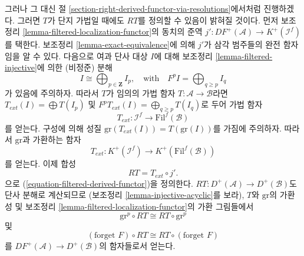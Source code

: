 \medskip\noindent
그러나 그 대신 절
\ref{section-right-derived-functor-via-resolutions}에서처럼 진행하겠다.
그러면 $T$가 단지 가법일 때에도 $RT$를 정의할 수 있음이 밝혀질
것이다. 먼저 보조정리 \ref{lemma-filtered-localization-functor}의 동치의
준역 $j' : DF^{+}(\mathcal{A}) \to K^{+}(\mathcal{I}^f)$를 택한다.
보조정리 \ref{lemma-exact-equivalence}에 의해 $j'$가 삼각 범주들의
완전 함자임을 알 수 있다. 다음으로 여과 단사 대상 $I$에 대해 보조정리
\ref{lemma-filtered-injective}에 의한 (비정준) 분해
\begin{equation}
\label{equation-decompose}
I \cong \bigoplus\nolimits_{p \in \mathbf{Z}} I_p,
\quad\text{with}\quad
F^pI = \bigoplus\nolimits_{q \geq p} I_q
\end{equation}
가 있음에 주의하자. 따라서 $T$가 임의의 가법 함자
$T : \mathcal{A} \to \mathcal{B}$라면
$T_{ext}(I) = \bigoplus T(I_p)$ 및
$F^pT_{ext}(I) = \bigoplus_{q \geq p} T(I_q)$로 두어 가법 함자
\begin{equation}
\label{equation-extend-T}
T_{ext} : \mathcal{I}^f \to \text{Fil}^f(\mathcal{B})
\end{equation}
를 얻는다. 구성에 의해 성질
$\text{gr}(T_{ext}(I)) = T(\text{gr}(I))$를 가짐에 주의하자.
따라서 $\text{gr}$과 가환하는 함자
\begin{equation}
\label{equation-extend-T-complexes}
T_{ext} : K^{+}(\mathcal{I}^f) \to K^{+}(\text{Fil}^f(\mathcal{B}))
\end{equation}
를 얻는다. 이제 합성
\begin{equation}
\label{equation-definition-filtered-derived-functor}
RT = T_{ext} \circ j'.
\end{equation}
으로 (\ref{equation-filtered-derived-functor})을 정의한다.
$RT : D^{+}(\mathcal{A}) \to D^{+}(\mathcal{B})$도 단사 분해로 계산되므로
(보조정리 \ref{lemma-injective-acyclic}를 보라), $T$와 $\text{gr}$의
가환성 및 보조정리 \ref{lemma-filtered-localization-functor}의 가환
그림들에서
\begin{equation}
\label{equation-commute-gr}
\text{gr}^p \circ RT \cong RT \circ \text{gr}^p
\end{equation}
및
\begin{equation}
\label{equation-commute-forget}
(\text{forget }F) \circ RT \cong RT \circ (\text{forget }F)
\end{equation}
를 $DF^{+}(\mathcal{A}) \to D^{+}(\mathcal{B})$의 함자들로서 얻는다.

